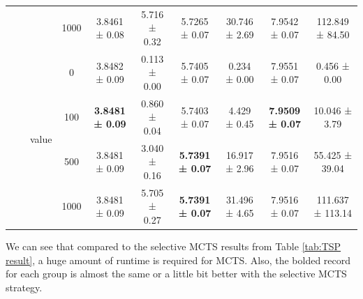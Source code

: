 \documentclass{article}
\begin{document}
\begin{table}[htbp]
{\begin{tabular}{c|c|c|c|c|c|c|c|c|c}
           &        &        & 1000   & 3.8461 ± 0.08 & 5.716 ± 0.32 & 5.7265 ± 0.07 & 30.746 ± 2.69 & 7.9542 ± 0.07 & 112.849 ± 84.50 \\
\cmidrule{3-10}           &        & \multicolumn{1}{c|}{\multirow{4}[2]{*}{value}} & 0      & 3.8482 ± 0.09 & 0.113 ± 0.00 & 5.7405 ± 0.07 & 0.234 ± 0.00 & 7.9551 ± 0.07 & 0.456 ± 0.00 \\
           &        &        & 100    & \textbf{3.8481 ± 0.09} & 0.860 ± 0.04 & 5.7403 ± 0.07 & 4.429 ± 0.45 & \textbf{7.9509 ± 0.07} & 10.046 ± 3.79 \\
           &        &        & 500    & 3.8481 ± 0.09 & 3.040 ± 0.16 & \textbf{5.7391 ± 0.07} & 16.917 ± 2.96 & 7.9516 ± 0.07 & 55.425 ± 39.04 \\
           &        &        & 1000   & 3.8481 ± 0.09 & 5.705 ± 0.27 & \textbf{5.7391 ± 0.07} & 31.496 ± 4.65 & 7.9516 ± 0.07 & 111.637 ± 113.14 \\
    \bottomrule
    \end{tabular}%
    }
  \label{tab:non-selective MCTS TSP}%
\end{table}%

 We can see that compared to the selective MCTS results from Table \ref{tab:TSP result}, a huge amount of runtime is required for MCTS. Also, the bolded record for each group is almost the same or a little bit better with the selective MCTS strategy.
\end{document}
